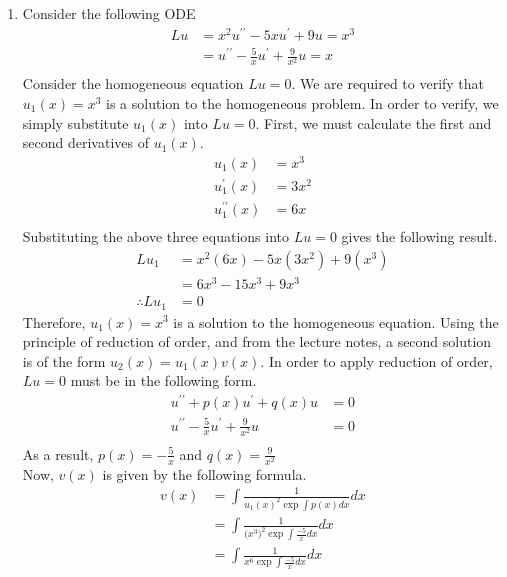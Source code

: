 \documentclass[a4paper]{article}
\newcommand{\ds}{\displaystyle}
\begin{document}
\begin{enumerate}

	\item Consider the following ODE
	\begin{align*}
		Lu & = x^2u^{\prime\prime} - 5xu^{\prime} + 9u = x^3\\
		& = u^{\prime\prime} - \frac{5}{x}u^{\prime} + \frac{9}{x^2}u = x\\
	\end{align*}
	Consider the homogeneous equation $\ds{Lu=0}$. We are required to verify that $\ds{u_{1}(x) = x^3}$ is a solution to the homogeneous problem. In order to verify, we simply substitute $\ds{u_{1}(x)}$ into $\ds{Lu=0}$. First, we must calculate the first and second derivatives of $\ds{u_{1}(x)}$.
	\begin{align*}
		u_{1}(x) & = x^3\\
		u_{1}^{\prime}(x) & = 3x^2\\
		u_{1}^{\prime\prime}(x) & = 6x\\
	\end{align*}
	Substituting the above three equations into $\ds{Lu=0}$ gives the following result.
	\begin{align*}
		Lu_{1} & = x^2(6x) - 5x(3x^2) + 9(x^3)\\
		& = 6x^3 - 15x^3 + 9x^3\\
		\therefore Lu_{1} & = 0
	\end{align*}
	Therefore, $\ds{u_{1}(x) = x^3}$ is a solution to the homogeneous equation.
	\bigbreak
	Using the principle of reduction of order, and from the lecture notes, a second solution is of the form $\ds{u_{2}(x) = u_{1}(x)v(x)}$. In order to apply reduction of order, $\ds{Lu=0}$ must be in the following form.
	\begin{align*}
		u^{\prime\prime} + p(x)u^{\prime} + q(x)u & = 0\\
		u^{\prime\prime} - \frac{5}{x}u^{\prime} + \frac{9}{x^2}u & = 0\\
	\end{align*}
	As a result, $\ds{p(x) = - \frac{5}{x}}$ and $\ds{q(x) = \frac{9}{x^2}}$\\
	Now, $\ds{v(x)}$ is given by the following formula.
	\begin{align*}
		v(x) & = \int\frac{1}{u_{1}(x)^2\exp{\int p(x)dx}}dx\\
		& = \int\frac{1}{\big(x^3\big)^2\exp{\int \frac{-5}{x}dx}}dx\\
		& = \int\frac{1}{x^6\exp{\int \frac{-5}{x}dx}}dx\\

\end{align*}
\end{enumerate}
\end{document}
